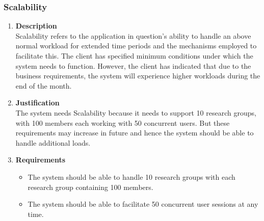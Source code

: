 \documentclass[a4paper,10pt]{article}
\begin{document}
\subsubsection{Scalability}
\begin{enumerate}
\item \textbf{Description} \\
Scalability refers to the application in question's ability to handle an above normal workload for extended time periods and the mechanisms employed to facilitate this. The client has specified minimum conditions under which the system needs to function. However, the client has indicated that due to the business requirements, the system will experience higher workloads during the end of the month.
\item \textbf{Justification} \\
The system needs Scalability because it needs to support 10 research groups, with 100 members each working with 50 concurrent users. But these requirements may increase in future and hence the system should be able to handle additional loads.
\item \textbf{Requirements}
	\begin{itemize}
		\item The system should be able to handle 10 research groups with each research group containing 100 members.
		\item The system should be able to facilitate 50 concurrent user sessions at any time.
	\end{itemize}
\end{enumerate}
\end{document}
